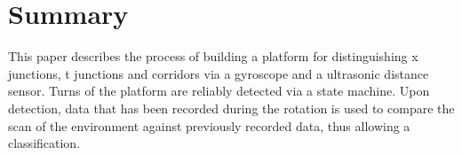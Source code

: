 \section{Summary}
\label{sec:summary}

This paper describes the process of building a platform for distinguishing x junctions, t junctions and corridors via a gyroscope and a ultrasonic distance sensor.
Turns of the platform are reliably detected via a state machine.
Upon detection, data that has been recorded during the rotation is used to compare the scan of the environment against previously recorded data, thus allowing a classification.